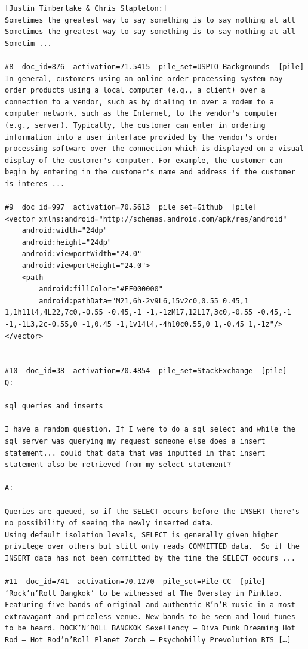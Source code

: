 \begin{verbatim}
[Justin Timberlake & Chris Stapleton:]
Sometimes the greatest way to say something is to say nothing at all
Sometimes the greatest way to say something is to say nothing at all
Sometim ...

#8  doc_id=876  activation=71.5415  pile_set=USPTO Backgrounds  [pile]
In general, customers using an online order processing system may order products using a local computer (e.g., a client) over a connection to a vendor, such as by dialing in over a modem to a computer network, such as the Internet, to the vendor's computer (e.g., server). Typically, the customer can enter in ordering information into a user interface provided by the vendor's order processing software over the connection which is displayed on a visual display of the customer's computer. For example, the customer can begin by entering in the customer's name and address if the customer is interes ...

#9  doc_id=997  activation=70.5613  pile_set=Github  [pile]
<vector xmlns:android="http://schemas.android.com/apk/res/android"
    android:width="24dp"
    android:height="24dp"
    android:viewportWidth="24.0"
    android:viewportHeight="24.0">
    <path
        android:fillColor="#FF000000"
        android:pathData="M21,6h-2v9L6,15v2c0,0.55 0.45,1 1,1h11l4,4L22,7c0,-0.55 -0.45,-1 -1,-1zM17,12L17,3c0,-0.55 -0.45,-1 -1,-1L3,2c-0.55,0 -1,0.45 -1,1v14l4,-4h10c0.55,0 1,-0.45 1,-1z"/>
</vector>


#10  doc_id=38  activation=70.4854  pile_set=StackExchange  [pile]
Q:

sql queries and inserts

I have a random question. If I were to do a sql select and while the sql server was querying my request someone else does a insert statement... could that data that was inputted in that insert statement also be retrieved from my select statement?

A:

Queries are queued, so if the SELECT occurs before the INSERT there's no possibility of seeing the newly inserted data.
Using default isolation levels, SELECT is generally given higher privilege over others but still only reads COMMITTED data.  So if the INSERT data has not been committed by the time the SELECT occurs ...

#11  doc_id=741  activation=70.1270  pile_set=Pile-CC  [pile]
‘Rock’n’Roll Bangkok’ to be witnessed at The Overstay in Pinklao. Featuring five bands of original and authentic R’n’R music in a most extravagant and priceless venue. New bands to be seen and loud tunes to be heard. ROCK’N’ROLL BANGKOK Sexellency – Diva Punk Dreaming Hot Rod – Hot Rod’n’Roll Planet Zorch – Psychobilly Prevolution BTS […]


\end{verbatim}
